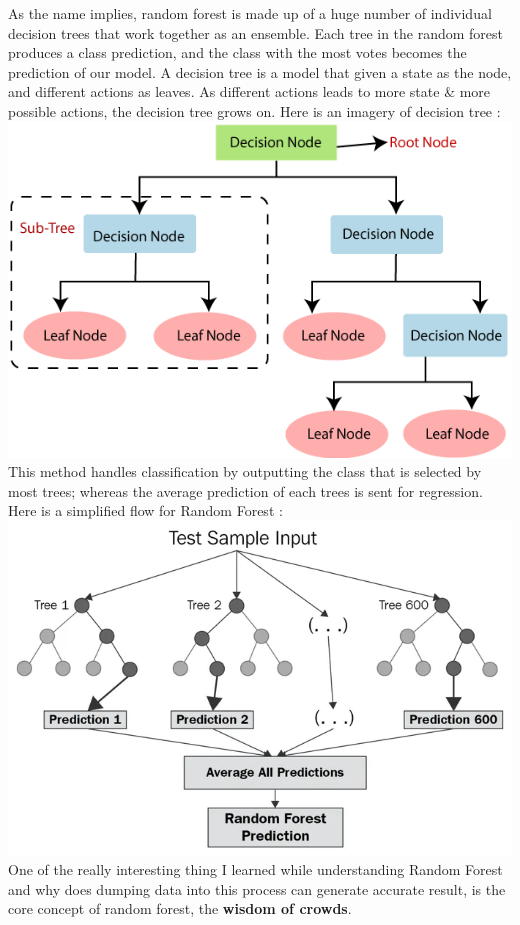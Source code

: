 \documentclass{article}
\begin{document}
As the name implies, random forest is made up of a huge number of individual decision trees that work together as an ensemble. Each tree in the random forest produces a class prediction, and the class with the most votes becomes the prediction of our model. A decision tree is a model that given a state as the node, and different actions as leaves. As different actions leads to more state & more possible actions, the decision tree grows on. Here is an imagery of decision tree \cite{dTree}:\\
\includegraphics[width=\textwidth]{images/descTree.png}\\
This method handles classification by outputting the class that is selected by most trees; whereas the average prediction of each trees is sent for regression. Here is a simplified flow for Random Forest \cite{randForest}:\\
\includegraphics[width=\textwidth]{images/random-forest.png}\\
One of the really interesting thing I learned while understanding Random Forest and why does dumping data into this process can generate accurate result, is the core concept of random forest, the \textbf{wisdom of crowds}. \\
\end{document}
